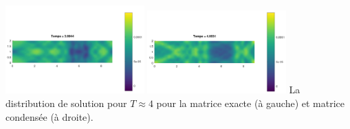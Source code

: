 \documentclass[12pt]{article}
\begin{document}
\begin{center}
	\hspace{1cm}\includegraphics[width=0.4\textwidth]{images/T4.png}\hspace{1cm}
	\includegraphics[width=0.4\textwidth]{images/T4cond.png}\hspace{1cm}
	{La distribution de solution pour $T \approx 4$ pour la matrice exacte (à gauche) et matrice condensée (à droite)}.
\end{center}
\end{document}
